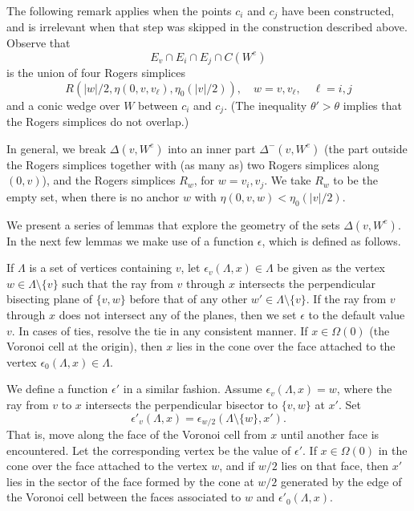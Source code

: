 \begin{remark}
The following remark applies when the points $c_i$ and $c_j$ have
been constructed, and is irrelevant when that step was skipped in
the construction described above. Observe that
    $$E_v\cap E_i\cap E_j \cap C(W^e)$$
is the union of four Rogers simplices
    $$
    R(|w|/2,\eta(0,v,v_\ell),\eta_0(|v|/2)),
    \quad w = v,v_\ell,\quad
    \ell = i,j
    $$
and a conic wedge over $W$ between $c_i$ and $c_j$. (The
inequality $\theta'>\theta$ implies that the Rogers simplices do
not overlap.)
\end{remark}

In general, we break $\Delta(v,W^e)$ into an inner part
$\Delta^-(v,W^e)$ (the part outside the Rogers simplices together
with (as many as) two Rogers simplices along $(0,v)$), and the
Rogers simplices $R_w$, for $w=v_i,v_j$.  We take $R_w$ to be the
empty set, when there is no anchor $w$ with
$\eta(0,v,w)<\eta_0(|v|/2)$.



We present a series of lemmas that explore the geometry of the sets
$\Delta(v,W^e)$.  In the next few lemmas we make use of a function
$\epsilon$, which is defined as follows.

\begin{definition}
If $\Lambda$ is a set of vertices containing $v$,
 let
$\epsilon_v(\Lambda,x)\in \Lambda$ be given as the vertex $w\in
\Lambda\setminus\{v\}$ such that the ray from $v$ through $x$
intersects the perpendicular bisecting plane of $\{v,w\}$ before
that of any other $w'\in \Lambda\setminus\{v\}$. If the ray from
$v$ through $x$ does not intersect any of the planes, then we set
$\epsilon$ to the default value $v$. In cases of ties, resolve the
tie in any consistent manner. If $x\in \Omega(0)$ (the Voronoi
cell at the origin), then $x$ lies in the cone over the face
attached to the vertex $\epsilon_0(\Lambda,x)\in \Lambda$.

We define a function $\epsilon'$ in a similar fashion. Assume
$\epsilon_v(\Lambda,x)=w$, where the ray from $v$ to $x$
intersects the perpendicular bisector to $\{v,w\}$ at $x'$. Set
  $$
  \epsilon'_v(\Lambda,x)=\epsilon_{w/2}(\Lambda\setminus\{w\},x').
  $$
 That is, move along
the face of the Voronoi cell from $x$ until another face is
encountered.  Let the corresponding vertex be the value of
$\epsilon'$.  If $x\in \Omega(0)$ in the cone over the face
attached to the vertex $w$, and if $w/2$ lies on that face, then
$x'$ lies in the sector of the face formed by the cone at $w/2$
generated by the edge of the Voronoi cell between the faces
associated to $w$ and $\epsilon'_0(\Lambda,x)$.
\end{definition}

